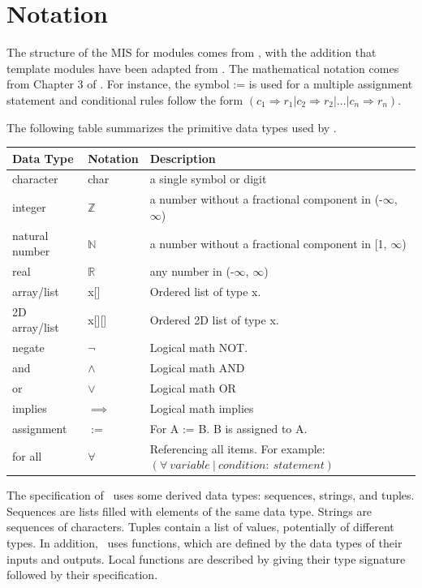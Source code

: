 \documentclass[12pt, titlepage]{article}
\begin{document}
\section{Notation}

The structure of the MIS for modules comes from \cite{HoffmanAndStrooper1995},
with the addition that template modules have been adapted from
\cite{GhezziEtAl2003}.  The mathematical notation comes from Chapter 3 of
\cite{HoffmanAndStrooper1995}.  For instance, the symbol := is used for a
multiple assignment statement and conditional rules follow the form $(c_1
\Rightarrow r_1 | c_2 \Rightarrow r_2 | ... | c_n \Rightarrow r_n )$.

The following table summarizes the primitive data types used by \progname. 

\begin{center}
\renewcommand{\arraystretch}{1.2}
\noindent 
\begin{tabular}{l l p{7.5cm}} 
\toprule 
\textbf{Data Type} & \textbf{Notation} & \textbf{Description}\\ 
\midrule
character & char & a single symbol or digit\\
integer & $\mathbb{Z}$ & a number without a fractional component in (-$\infty$,
  $\infty$) \\
natural number & $\mathbb{N}$ & a number without a fractional component in [1,
  $\infty$) \\
real & $\mathbb{R}$ & any number in (-$\infty$, $\infty$)\\
array/list & x[] & Ordered list of type x. \\
2D array/list & x[][] & Ordered 2D list of type x. \\
negate & $\neg$ & Logical math NOT.\\
and & $\wedge$ & Logical math AND \\
or & $\vee$ & Logical math OR \\
implies & $\implies$ & Logical math implies \\
assignment & $:=$ & For A := B. B is assigned to A. \\
for all & $\forall$ & Referencing all items. For example:
  $(\forall~variable~|~condition:~statement)$ \\
\bottomrule
\end{tabular} 
\end{center}

\noindent
The specification of \progname \ uses some derived data types: sequences,
strings, and tuples. Sequences are lists filled with elements of the same data
type. Strings are sequences of characters. Tuples contain a list of values,
potentially of different types. In addition, \progname \ uses functions, which
are defined by the data types of their inputs and outputs. Local functions are
described by giving their type signature followed by their specification.
\end{document}
